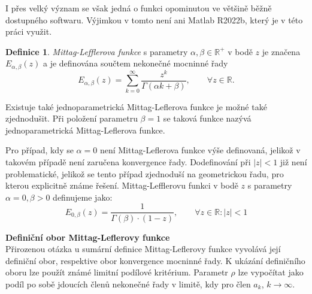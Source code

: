 \documentclass[a4paper,12pt,twoside]{article}
\theoremstyle{definition}
\newtheorem{defin}[veta]{Definice}
\theoremstyle{remark}
\numberwithin{equation}{section}
\numberwithin{table}{section}
\numberwithin{figure}{section}
\newcommand{\R}{\mathbb{R}}
\begin{document}
I přes velký význam se však jedná o funkci opominutou ve většině běžně dostupného softwaru. Výjimkou v tomto není ani Matlab R2022b, který je v této práci využit.

\begin{defin}\label{DefinMLfce} %
	\emph{Mittag-Lefflerova funkce} s parametry $\alpha, \beta \in \R^{+}$ v bodě $z$ je značena $E_{\alpha, \beta} \left( z\right)$ a je definována součtem nekonečné mocninné řady
	$$
	E_{\alpha, \beta} \left( z\right) =  \sum_{k=0}^{\infty} \frac{z^{k}}{\Gamma\left( \alpha k +\beta \right)}, \qquad \forall z \in  \R.  	
	$$
\end{defin}

Existuje také jednoparametrická Mittag-Leflerova funkce je možné také zjednodušit. Při položení parametru $\beta = 1$ se taková funkce nazývá jednoparametrická Mittag-Leflerova funkce.


Pro případ, kdy se $\alpha = 0$ není Mittag-Leflerova funkce výše definovaná, jelikož v takovém případě není zaručena konvergence řady. Dodefinování při $|z| < 1$ již není problematické, jelikož se tento případ zjednoduší na geometrickou řadu, pro kterou explicitně známe řešení. Mittag-Lefflerovu funkci v bodě $z$ s parametry $\alpha = 0, \beta > 0$ definujeme jako:
\begin{equation}
	E_{0, \beta}\left(z\right) = \frac{1}{\Gamma \left(\beta\right)\cdot \left(1-z\right)}, \qquad \forall z \in \R: |z| < 1
\end{equation}

\textbf{Definiční obor Mittag-Leflerovy funkce} \\
Přirozenou otázka u sumární definice Mittag-Leflerovy funkce vyvolává její definiční obor, respektive obor konvergence mocninné řady. 
K ukázání definičního oboru lze použít známé limitní podílové kritérium. Parametr $\rho$ lze vypočítat jako podíl po sobě jdoucích členů nekonečné řady v limitě, kdy pro člen $a_k$, $k \rightarrow \infty $.
\end{document}
